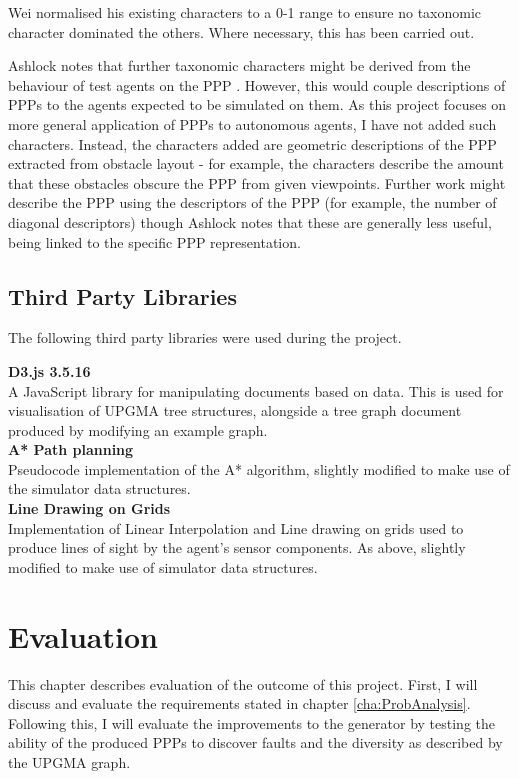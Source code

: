 \documentclass[authoryearcitations]{UoYCSproject}
\begin{document}
Wei normalised his existing characters to a 0-1 range to ensure no taxonomic character dominated the others. Where necessary, this has been carried out.

Ashlock notes that further taxonomic characters might be derived from the behaviour of test agents on the PPP \cite[section 7B]{ashlock}. However, this would couple descriptions of PPPs to the agents expected to be simulated on them. As this project focuses on more general application of PPPs to autonomous agents, I have not added such characters. Instead, the characters added are geometric descriptions of the PPP extracted from obstacle layout - for example, the characters describe the amount that these obstacles obscure the PPP from given viewpoints. Further work might describe the PPP using the descriptors of the PPP (for example, the number of diagonal descriptors) though Ashlock notes that these are generally less useful, being linked to the specific PPP representation\cite[section 7B]{ashlock}.

\section{Third Party Libraries}
\label{sec:tplibs}
The following third party libraries were used during the project.

\textbf{D3.js 3.5.16 \cite{d3js}}\\
A JavaScript library for manipulating documents based on data. This is used for visualisation of UPGMA tree structures, alongside a tree graph document produced by modifying an example graph.\\

\textbf{A* Path planning \cite{aStar}}\\
Pseudocode implementation of the A* algorithm, slightly modified to make use of the simulator data structures.\\

\textbf{Line Drawing on Grids \cite{lineDrawing}}\\
Implementation of Linear Interpolation and Line drawing on grids used to produce lines of sight by the agent's sensor components. As above, slightly modified to make use of simulator data structures.

\chapter{Evaluation}
\label{cha:Evaluation}
This chapter describes evaluation of the outcome of this project. First, I will discuss and evaluate the requirements stated in chapter \ref{cha:ProbAnalysis}. Following this, I will evaluate the improvements to the generator by testing the ability of the produced PPPs to discover faults and the diversity as described by the UPGMA graph.
\end{document}
